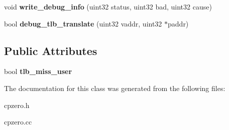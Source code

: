 \begin{DoxyCompactItemize}
\item 
\hypertarget{classCPZero_a8a84d1e9ffad8ec964d15b4acba13b50}{
void {\bfseries write\_\-debug\_\-info} (uint32 status, uint32 bad, uint32 cause)}
\label{classCPZero_a8a84d1e9ffad8ec964d15b4acba13b50}

\item 
\hypertarget{classCPZero_a1c5cbff0e8691ce9eccb50d8de55076d}{
bool {\bfseries debug\_\-tlb\_\-translate} (uint32 vaddr, uint32 $\ast$paddr)}
\label{classCPZero_a1c5cbff0e8691ce9eccb50d8de55076d}

\end{DoxyCompactItemize}
\subsection*{Public Attributes}
\begin{DoxyCompactItemize}
\item 
\hypertarget{classCPZero_a1eea9193d6c972d55568dedd9d3ea915}{
bool {\bfseries tlb\_\-miss\_\-user}}
\label{classCPZero_a1eea9193d6c972d55568dedd9d3ea915}

\end{DoxyCompactItemize}


The documentation for this class was generated from the following files:\begin{DoxyCompactItemize}
\item 
cpzero.h\item 
cpzero.cc\end{DoxyCompactItemize}
